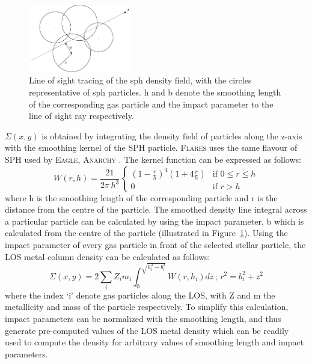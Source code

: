 \begin{figure}
	\centering
	\includegraphics[width=0.4\textwidth]{./figures/sph_ray}
	\caption{Line of sight tracing of the sph density field,  with the circles representative of sph particles. h and b denote the smoothing length of the corresponding gas particle and the impact parameter to the line of sight ray respectively. \label{fig: sph_ray}}
\end{figure}

$\Sigma (x,y)$ is obtained by integrating the density field of particles along the z-axis with the smoothing kernel of the SPH particle. \textsc{Flares} uses the same flavour of SPH used by \textsc{Eagle}, \textsc{Anarchy} \citep[see][for more details]{Schaller2015}. The kernel function can be expressed as follows:
\begin{equation}\label{eq: kernel}
W(r,h) = \dfrac{21}{2\pi\,h^3} 
\begin{cases}
(1-\frac{r}{h})^4 (1+4\frac{r}{h})& \text{if } 0 \leq r\leq h\\
0  & \text{if }r>h
\end{cases}
\end{equation}
where h is the smoothing length of the corresponding particle and r is the distance from the centre of the particle. The smoothed density line integral across a particular particle can be calculated by using the impact parameter, b which is calculated from the centre of the particle (illustrated in Figure~\ref{fig: sph_ray}). Using the impact parameter of every gas particle in front of the selected stellar particle, the LOS metal column density can be calculated as follows:
\begin{equation}\label{eq: Zlos}
\Sigma (x,y) = 2 \sum_i Z_i m_i \int_{0}^{\sqrt{h_i^2-b_i^2}}W(r, h_i)dz\,;\, r^2 = b_i^2 + z^2
\end{equation} 
where the index `i' denote gas particles along the LOS, with Z and m the metallicity and mass of the particle respectively. 
To simplify this calculation, impact parameters can be normalized with the smoothing length, and thus generate pre-computed values of the LOS metal density which can be readily used to compute the density for arbitrary values of smoothing length and impact parameters.

